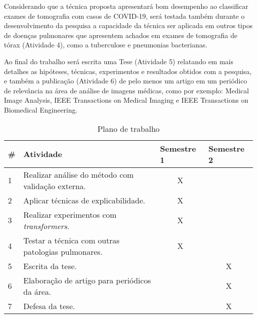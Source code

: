 Considerando que a técnica proposta apresentará bom desempenho ao classificar exames de tomografia com casos de COVID-19, será testada também durante o desenvolvimento da pesquisa a capacidade da técnica ser aplicada em outros tipos de doenças pulmonares que apresentem achados em exames de tomografia de tórax (Atividade 4), como a tuberculose e pneumonias bacterianas.

Ao final do trabalho será escrita uma Tese (Atividade 5) relatando em mais detalhes as hipóteses, técnicas, experimentos e resultados obtidos com a pesquisa, e também a publicação (Atividade 6) de pelo menos um artigo em um periódico de relevância na área de análise de imagens médicas, como por exemplo: Medical Image Analysis, IEEE Transactions on Medical Imaging e IEEE Transactions on Biomedical Engineering.

\begin{table}[]
\centering
\caption{Plano de trabalho}
\label{table:planejamento_atividades}
\begin{tabular}{llcl}
\hline
\# & Atividade                                                                       & \multicolumn{1}{l}{Semestre 1} & Semestre 2            \\ \hline
1 & Realizar análise do método com validação externa.                              & X                              &                       \\
2 & Aplicar técnicas de explicabilidade.                         & X                              &                       \\
3 & Realizar experimentos com \textit{transformers}.                 & X                              &                       \\
4 & Testar a técnica com outras patologias pulmonares.                              & X                              &                       \\
5 & Escrita da tese.                                                                & \multicolumn{1}{l}{}           & \multicolumn{1}{c}{X} \\
6 & Elaboração de artigo para periódicos da área.             & \multicolumn{1}{l}{}           & \multicolumn{1}{c}{X} \\
7 & Defesa da tese.                                                                 & \multicolumn{1}{l}{}           & \multicolumn{1}{c}{X} \\ \hline
\end{tabular}
\end{table}